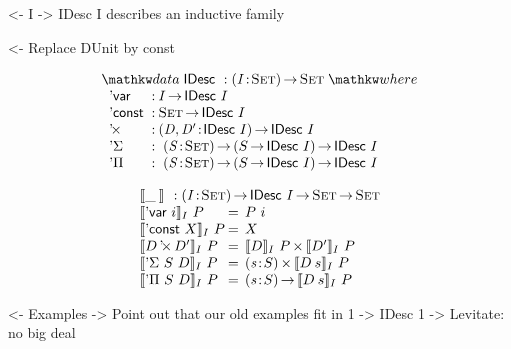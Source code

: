 \documentclass[preprint, authoryear]{sigplanconf}
\newenvironment{structure}{\footnotesize\verbatim}{\endverbatim}
\begin{document}
\begin{structure}
<- I -> IDesc I describes an inductive family
\end{structure}

\begin{structure}
<- Replace DUnit by const
\end{structure}


\[
\stk{
\data \IDesc{} : \PI{\V{I}}{\Set} \Set \where \\
\;\;\begin{array}{@{}l@{\::\:}l@{\quad}l}
    \DVar{}         & I \To \IDesc{I}                                   \\
    \DConst{}       & \Set \To \IDesc{I}                                \\
    \DProd{}{}      & \PI{\V{D}, \V{D'}}{\IDesc{I}} \IDesc{I}           \\
    \DSigma         & \PI{\V{S}}{\Set} \PIS{S \To \IDesc{I}} \IDesc{I}  \\
    \DPi            & \PI{\V{S}}{\Set} \PIS{S \To \IDesc{I}} \IDesc{I} 
\end{array}
}
\]


\[\stk{
\idescop{\_\:}{}{} : \PI{\V{I}}{\Set} \IDesc{I} \To \Set \To \Set                  \\
\begin{array}{@{}l@{\:=\:\:}ll}
\idescop{\DVar{i}}{I}{P}      &  P~i                                                 \\
\idescop{\DConst{X}}{I}{P}    &  X                                                   \\
\idescop{\DProd{D}{D'}}{I}{P} &  \TIMES{\idescop{D}{I}{P}}{\idescop{D'}{I}{P}}       \\
\idescop{\DSigma{S}{D}}{I}{P} &  \SIGMA{\V{s}}{S} \idescop{D\: s}{I}{P}                    \\
\idescop{\DPi{S}{D}}{I}{P}    &  \PI{\V{s}}{S} \idescop{D\: s}{I}{P}            
\end{array}
}\]

\begin{structure}
<- Examples
    -> Point out that our old examples fit in 1 -> IDesc 1
    -> Levitate: no big deal
\end{structure}
\end{document}
